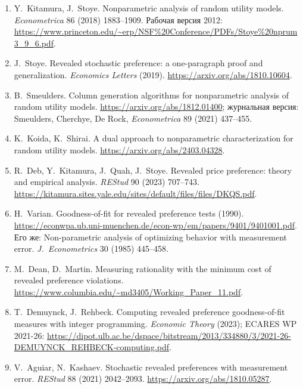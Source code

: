 \documentclass[a4paper,11pt]{article}
\theoremstyle{plain}
\theoremstyle{definition}
\theoremstyle{remark}
\begin{document}
\begin{enumerate}
    \item Y.~Kitamura, J.~Stoye. Nonparametric analysis of random utility models. \emph{Econometrica} 86 (2018) 1883--1909. Рабочая версия 2012: \url{https://www.princeton.edu/~erp/NSF%20Conference/PDFs/Stoye%20nprum3_9_6.pdf}.
    \item J.~Stoye. Revealed stochastic preference: a one-paragraph proof and generalization. \emph{Economics Letters} (2019). \url{https://arxiv.org/abs/1810.10604}.
    \item B.~Smeulders. Column generation algorithms for nonparametric analysis of random utility models. \url{https://arxiv.org/abs/1812.01400}; журнальная версия: Smeulders, Cherchye, De Rock, \emph{Econometrica} 89 (2021) 437--455.
    \item K.~Koida, K.~Shirai. A dual approach to nonparametric characterization for random utility models. \url{https://arxiv.org/abs/2403.04328}.
    \item R.~Deb, Y.~Kitamura, J.~Quah, J.~Stoye. Revealed price preference: theory and empirical analysis. \emph{REStud} 90 (2023) 707--743. \url{https://kitamura.sites.yale.edu/sites/default/files/files/DKQS.pdf}.
    \item H.~Varian. Goodness-of-fit for revealed preference tests (1990). \url{https://econwpa.ub.uni-muenchen.de/econ-wp/em/papers/9401/9401001.pdf}. Его же: Non-parametric analysis of optimizing behavior with measurement error. \emph{J.~Econometrics} 30 (1985) 445--458.
    \item M.~Dean, D.~Martin. Measuring rationality with the minimum cost of revealed preference violations. \url{https://www.columbia.edu/~md3405/Working_Paper_11.pdf}.
    \item T.~Demuynck, J.~Rehbeck. Computing revealed preference goodness-of-fit measures with integer programming. \emph{Economic Theory} (2023); ECARES WP 2021-26: \url{https://dipot.ulb.ac.be/dspace/bitstream/2013/334880/3/2021-26-DEMUYNCK_REHBECK-computing.pdf}.
    \item V.~Aguiar, N.~Kashaev. Stochastic revealed preferences with measurement error. \emph{REStud} 88 (2021) 2042--2093. \url{https://arxiv.org/abs/1810.05287}.
\end{enumerate}
\end{document}
